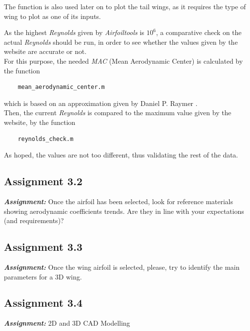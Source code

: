 \documentclass{article}
\begin{document}
The function is also used later on to plot the tail wings, as it requires the type of wing to plot as one of its inputs.\\
\clearpage

As the highest \textit{Reynolds} given by \textit{Airfoiltools} is $10^6$, a comparative check on the 
actual \textit{Reynolds} should be run, in order to see whether the values given by the website are 
accurate or not.\\ 
For this purpose, the needed \textit{MAC} (Mean Aerodynamic Center) is calculated by the 
function \autocite{Airbus_replacement_repo}
\begin{verbatim}
    mean_aerodynamic_center.m
\end{verbatim}
which is based on an approximation given by Daniel P. Raymer \autocite{Raymer_Daniel}. \\ 

Then, the current \textit{Reynolds} is compared to the maximum value given by the website, by the function

\begin{verbatim}
    reynolds_check.m
\end{verbatim}

As hoped, the values are not too different, thus validating the rest of the data.\\ 
\clearpage

\subsection{Assignment 3.2\label{Assignment_3.2}}

\textbf{\textit{Assignment:}} Once the airfoil has been selected, look for reference materials
showing aerodynamic coefficients trends. 
Are they in line with your expectations (and requirements)? 
\clearpage

\subsection{Assignment 3.3\label{Assignment_3.3}}

\textbf{\textit{Assignment:}} Once the wing airfoil is selected, please, 
try to identify the main parameters for a 3D wing. 
\clearpage 
\subsection{Assignment 3.4\label{Assignment_3.4}}

\textbf{\textit{Assignment:}} 2D and 3D CAD Modelling 
\end{document}
